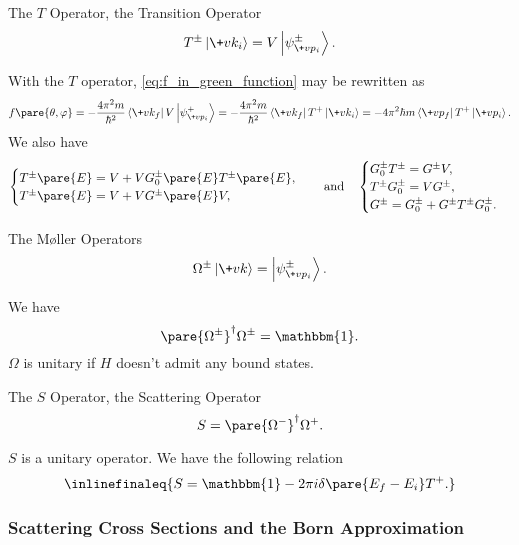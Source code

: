 \documentclass[hidelinks]{article}
\begin{document}

\label{ssub:the_t_operator_and_the_s_operator}

\begin{termdef}{The $T$ Operator, the Transition Operator}
    \[ T^{\pm}\ket{\+vk_i} = V\ket{\psi_{\+vp_i}^\pm}. \]
\end{termdef}
With the $T$ operator, \eqref{eq:f_in_green_function} may be rewritten as
\[ f\pare{\theta,\varphi} = -\frac{4\pi^2m}{\hbar^2}\bra{\+vk_f}V\ket{\psi_{\+vp_i}^+} = -\frac{4\pi^2 m}{\hbar^2}\bra{\+vk_f}T^+\ket{\+vk_i} = -4\pi^2\hbar m\bra{\+vp_f}T^+\ket{\+vp_i}. \]
We also have
\begin{equation}
\label{eq:t_operator_eq}
\begin{cases}
    T^\pm\pare{E} = V + VG^\pm_0\pare{E}T^\pm\pare{E}, \\
    T^\pm\pare{E} = V + VG^\pm\pare{E}V,
\end{cases}\quad\text{and}\quad \begin{cases}
    G_0^\pm T^\pm = G^\pm V, \\
    T^\pm G_0^\pm = VG^\pm, \\
    G^\pm = G^\pm_0 + G^\pm T^\pm G^\pm_0.
\end{cases}
\end{equation}
\vspace{-\baselineskip}
\begin{termdef}{The M\o ller Operators}
    \[ \Omega^\pm \ket{\+vk} = \ket{\psi_{\+vp_i}^\pm}. \]
\end{termdef}
We have
\[ \pare{\Omega^\pm}^\dagger \Omega^\pm = \mathbbm{1}. \]
$\Omega$ is unitary if $H$ doesn't admit any bound states.
\begin{termdef}{The $S$ Operator, the Scattering Operator}
    \[ S = \pare{\Omega^-}^\dagger \Omega^+. \]
\end{termdef}
$S$ is a unitary operator. We have the following relation
\[ \inlinefinaleq{S = \mathbbm{1} - 2\pi i\delta\pare{E_f - E_i}T^+.} \]


\subsubsection{Scattering Cross Sections and the Born Approximation} %
\label{ssub:scattering_cross_sections_and_the_born_approximation}
\end{document}
